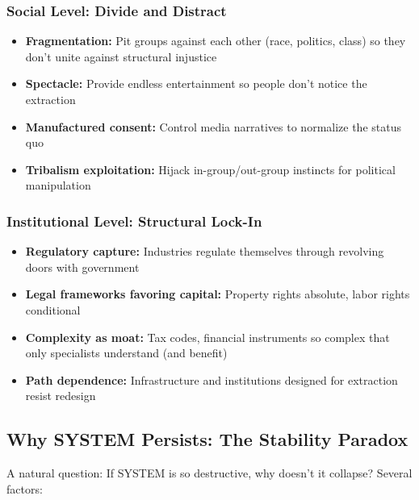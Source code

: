 \documentclass[11pt,a4paper]{article}
\theoremstyle{definition}
\theoremstyle{remark}
\begin{document}
\subsubsection{Social Level: Divide and Distract}

\begin{itemize}
    \item \textbf{Fragmentation:} Pit groups against each other (race, politics, class) so they don't unite against structural injustice
    \item \textbf{Spectacle:} Provide endless entertainment so people don't notice the extraction
    \item \textbf{Manufactured consent:} Control media narratives to normalize the status quo
    \item \textbf{Tribalism exploitation:} Hijack in-group/out-group instincts for political manipulation
\end{itemize}

\subsubsection{Institutional Level: Structural Lock-In}

\begin{itemize}
    \item \textbf{Regulatory capture:} Industries regulate themselves through revolving doors with government
    \item \textbf{Legal frameworks favoring capital:} Property rights absolute, labor rights conditional
    \item \textbf{Complexity as moat:} Tax codes, financial instruments so complex that only specialists understand (and benefit)
    \item \textbf{Path dependence:} Infrastructure and institutions designed for extraction resist redesign
\end{itemize}

\subsection{Why SYSTEM Persists: The Stability Paradox}

A natural question: If SYSTEM is so destructive, why doesn't it collapse? Several factors:
\end{document}
